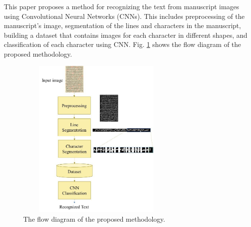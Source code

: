 This paper \cite{CNN} proposes a method for recognizing the text from manuscript images using Convolutional Neural Networks (CNNs). This includes preprocessing of the manuscript’s image, segmentation of the lines and characters in the manuscript, building a dataset that contains images for each character in different shapes, and classification of each character using CNN.
Fig. \ref{fig:CNN} shows the flow diagram of the proposed methodology.

\begin{figure}[!htb]
    \centering
    \includegraphics[width=8cm, height=8cm]{images/CNN.png}
    \caption{The flow diagram of the proposed methodology.}
    \label{fig:CNN}
\end{figure}

